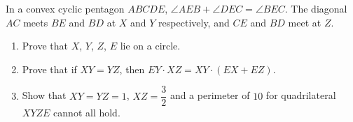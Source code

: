 In a convex cyclic pentagon $ABCDE$, $\angle AEB+\angle DEC=\angle BEC$. The diagonal $AC$ meets $BE$ and $BD$ at $X$ and $Y$ respectively, and $CE$ and $BD$ meet at $Z$.
\begin{enumerate}
\item[(a)] Prove that $X$, $Y$, $Z$, $E$ lie on a circle.
\item[(b)] Prove that if $XY=YZ$, then $EY\cdot XZ=XY\cdot(EX+EZ)$.
\item[(c)] Show that $XY=YZ=1$, $XZ=\dfrac{3}{2}$ and a perimeter of $10$ for quadrilateral $XYZE$ cannot all hold.
\end{enumerate}
